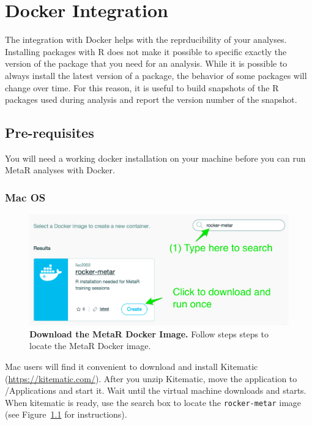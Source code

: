 

\chapter{Docker Integration}\label{chap:DockerIntegration}
The integration with Docker helps with the reprducibility of your analyses. Installing packages with R does not make it possible to specific exactly the version of the package that you need for an analysis. While it is possible to always install the latest version of a package, the behavior of some packages will change over time. For this reason, it is useful to build snapshots of the R packages used during analysis and report the version number of the snapshot. 

\section{Pre-requisites}
You will need a working docker installation on your machine before you can run MetaR analyses with Docker.
\subsection{Mac OS}
\begin{figure}
  \centering
  \includegraphics[width=\figWidthNarrow]{figures/Rocker-MetaR-Image.png}
\caption[Download the MetaR Docker Image.]{\textbf{Download the MetaR Docker Image.} Follow steps steps to locate the MetaR Docker image.}
\label{fig:RockerMetaRImage}
\end{figure}

Mac users will find it convenient to download and install Kitematic (\url{https://kitematic.com/}). 
 After you unzip Kitematic, move the application to /Applications and start it. Wait until the virtual machine downloads and starts. When kitematic is ready, use the search box to locate the \texttt{rocker-metar} image (see Figure~\ref{fig:RockerMetaRImage} for instructions). 


